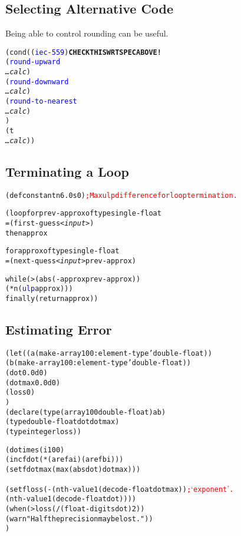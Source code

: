 \documentclass[10pt,fleqn]{article}
\newcommand{\codelia}[1]{\textcolor{blue}{#1}}
\begin{document}
\subsection{Selecting Alternative Code}

Being able to control rounding can be useful.
\begin{alltt}
    (cond ((\codelia{iec-559}) \textbf{CHECK THIS WRT SPEC ABOVE!}
           (\codelia{round-upward} 
              \textit{\ldots calc})
           (\codelia{round-downward}
              \textit{\ldots calc})
           (\codelia{round-to-nearest}
              \textit{\ldots calc})
           )
          (t
           \textit{\ldots calc}))
\end{alltt}

\subsection{Terminating a Loop}

\begin{alltt}
    (defconstant n 6.0s0) \textcolor{red}{; Max ulp difference for loop termination.}

    (loop for prev-approx of type single-float
          = (first-guess <\textit{input}>)
          then approx

          for approx of type single-float
          = (next-quess <\textit{input}> prev-approx)

          while (> (abs (- approx prev-approx))
                   (* n (\codelia{ulp} approx)))
          finally (return approx))
\end{alltt}


\subsection{Estimating Error}

\begin{alltt}
    (let ((a (make-array 100 :element-type 'double-float))
          (b (make-array 100 :element-type 'double-float))
          (dot 0.0d0)
          (dotmax 0.0d0)
          (loss 0)
         )
      (declare (type (array 100 double-float) a b)
               (type double-float dot dotmax)
               (type integer loss))
     
      (dotimes (i 100)
         (incf dot (* (aref a i) (aref b i)))
         (setf dotmax (max (abs dot) dotmax)))

      (setf loss (- (nth-value 1 (decode-float dotmax)) \textcolor{red}{; `exponent'.}
                    (nth-value 1 (decode-float dot))))
      (when (> loss (/ (float-digits dot) 2))
         (warn "Half the precision may be lost."))
      )
\end{alltt}
\end{document}
